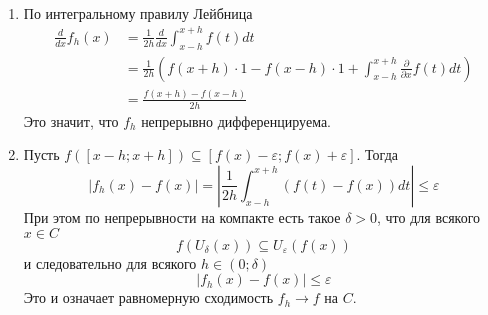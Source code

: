 \documentclass[12pt,a4paper]{article}
\begin{document}
    \begin{enumproblem}\ItemedProblem\ 
        \begin{enumerate}
            \item По интегральному правилу Лейбница
                \begin{align*}
                    \frac{d}{dx} f_h(x)
                    &= \frac{1}{2h} \frac{d}{dx} \int_{x-h}^{x+h} f(t) dt\\
                    &= \frac{1}{2h} \left(f(x+h) \cdot 1 - f(x-h) \cdot 1 + \int_{x-h}^{x+h} \frac{\partial}{\partial x} f(t) dt\right)\\
                    &= \frac{f(x+h) - f(x-h)}{2h}
                \end{align*}
                Это значит, что $f_h$ непрерывно дифференцируема.

            \item Пусть $f([x-h; x+h]) \subseteq [f(x) - \varepsilon; f(x) + \varepsilon]$. Тогда
                \[|f_h(x) - f(x)| = \left|\frac{1}{2h} \int_{x-h}^{x+h} (f(t) - f(x)) dt\right| \leqslant \varepsilon\]
                При этом по непрерывности на компакте есть такое $\delta > 0$, что для всякого $x \in C$
                \[f(U_\delta(x)) \subseteq U_\varepsilon(f(x))\]
                и следовательно для всякого $h \in (0; \delta)$
                \[|f_h(x) - f(x)| \leqslant \varepsilon\]
                Это и означает равномерную сходимость $f_h \to f$ на $C$. 
        \end{enumerate}
    \end{enumproblem}
\end{document}
